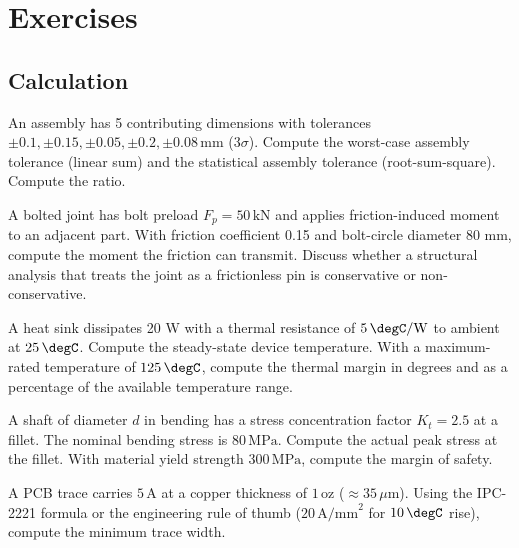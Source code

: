 \section{Exercises}

\subsection*{Calculation}

\begin{exercise}
An assembly has 5 contributing dimensions with tolerances $\pm 0.1, \pm 0.15, \pm 0.05, \pm 0.2, \pm 0.08\,\text{mm}$ (3$\sigma$). Compute the worst-case assembly tolerance (linear sum) and the statistical assembly tolerance (root-sum-square). Compute the ratio.
\end{exercise}

\begin{exercise}
A bolted joint has bolt preload $F_p = 50\,\text{kN}$ and applies friction-induced moment to an adjacent part. With friction coefficient 0.15 and bolt-circle diameter 80 mm, compute the moment the friction can transmit. Discuss whether a structural analysis that treats the joint as a frictionless pin is conservative or non-conservative.
\end{exercise}

\begin{exercise}
A heat sink dissipates 20 W with a thermal resistance of $5\,\degC/\text{W}$ to ambient at $25\,\degC$. Compute the steady-state device temperature. With a maximum-rated temperature of $125\,\degC$, compute the thermal margin in degrees and as a percentage of the available temperature range.
\end{exercise}

\begin{exercise}
A shaft of diameter $d$ in bending has a stress concentration factor $K_t = 2.5$ at a fillet. The nominal bending stress is $80\,\text{MPa}$. Compute the actual peak stress at the fillet. With material yield strength $300\,\text{MPa}$, compute the margin of safety.
\end{exercise}

\begin{exercise}
A PCB trace carries $5\,\text{A}$ at a copper thickness of $1\,\text{oz}$ ($\approx 35\,\mu\text{m}$). Using the IPC-2221 formula or the engineering rule of thumb ($20\,\text{A/mm}^2$ for $10\,\degC$ rise), compute the minimum trace width.
\end{exercise}

